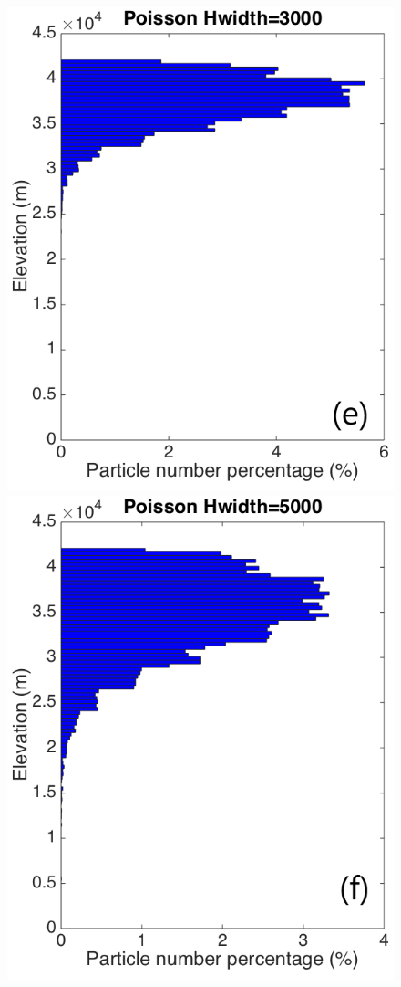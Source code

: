 \documentclass[utf8]{frontiersSCNS} %
\begin{document}
\begin{figure}[!htb]
\begin{minipage}{.247 \textwidth}
\includegraphics[width=0.99 \textwidth]{Figures/Possion-Hwidth3k-ParticleDis-z}
\end{minipage}%
\begin{minipage}{.247 \textwidth}
\centering
\includegraphics[width=0.99 \textwidth]{Figures/Possion-Hwidth5k-ParticleDis-z}

\end{minipage}
\end{figure}
\end{document}
